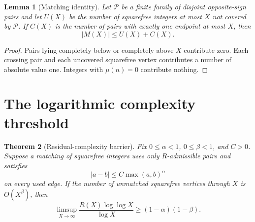 \documentclass[11pt,a4paper]{amsart}
\newtheorem{theorem}{Theorem}[section]
\newtheorem{lemma}[theorem]{Lemma}
\theoremstyle{definition}
\theoremstyle{remark}
\newcommand{\mob}{\mu}
\newcommand{\M}{M}
\begin{document}
\begin{lemma}[Matching identity]\label{lem:matching}
Let $\mathcal P$ be a finite family of disjoint opposite-sign pairs and let
$U(X)$ be the number of squarefree integers at most $X$ not covered by
$\mathcal P$.  If $C(X)$ is the number of pairs with exactly one endpoint at
most $X$, then
\[
 |\M(X)|\leq U(X)+C(X).
\]
\end{lemma}

\begin{proof}
Pairs lying completely below or completely above $X$ contribute zero.  Each
crossing pair and each uncovered squarefree vertex contributes a number of
absolute value one.  Integers with $\mob(n)=0$ contribute nothing.
\end{proof}

\section{The logarithmic complexity threshold}

\begin{theorem}[Residual-complexity barrier]\label{thm:threshold}
Fix $0\leq\alpha<1$, $0\leq\beta<1$, and $C>0$.  Suppose a matching of
squarefree integers uses only $R$-admissible pairs and satisfies
\begin{equation}\label{eq:short}
 |a-b|\leq C\max(a,b)^\alpha
\end{equation}
on every used edge.  If the number of unmatched squarefree vertices through
$X$ is $O(X^\beta)$, then
\begin{equation}\label{eq:threshold}
 \limsup_{X\to\infty}
 \frac{R(X)\log\log X}{\log X}
 \geq (1-\alpha)(1-\beta).
\end{equation}
\end{theorem}
\end{document}
